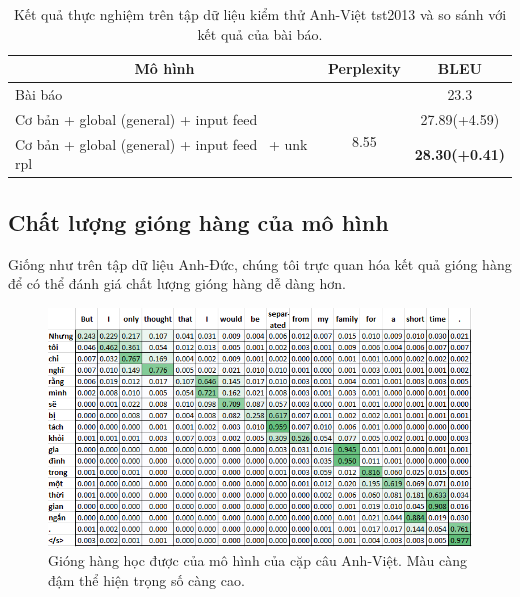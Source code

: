 \begin{table}
	\centering
	\caption{Kết quả thực nghiệm trên tập dữ liệu kiểm thử Anh-Việt tst2013 và so sánh với kết quả của bài báo.}
	\begin{tabular}{|l|c|c|} 
		\hline
		\multicolumn{1}{|c|}{ \textbf{Mô hình} }          & \textbf{Perplexity}   & \textbf{BLEU}                               \\ 
		\hline
		Bài báo                                           &                       & 23.3                                        \\ 
		\hline
		Cơ bản + global (general) + input feed~           & \multirow{2}{*}{8.55} & 27.89(+4.59)                                \\ 
		\cline{1-1}\cline{3-3}
		Cơ bản + global (general) + input feed~ + unk rpl &                       & \multicolumn{1}{l|}{\textbf{28.30(+0.41)}}  \\
		\hline
	\end{tabular}
	\label{tab_en-vi_results}
\end{table}

\subsection{Chất lượng gióng hàng của mô hình}
Giống như trên tập dữ liệu Anh-Đức, chúng tôi trực quan hóa kết quả gióng hàng để có thể đánh giá chất lượng gióng hàng dễ dàng hơn.

\begin{figure}
	\centering
	\includegraphics[width=1.0\textwidth]{en-vi_attn-weights_25.png}
	\caption[Gióng hàng học được của mô hình của cặp câu Anh-Việt.]{Gióng hàng học được của mô hình của cặp câu Anh-Việt. Màu càng đậm thể hiện trọng số càng cao.}
	\label{fig_en-vi_attn-weights_25}
\end{figure}

